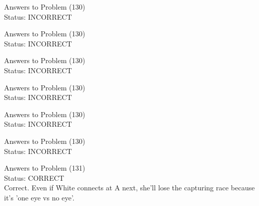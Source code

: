 \documentclass[11pt]{article}
\begin{document}
\begin{minipage}[t]{0.5\textwidth}
  {\centering
  
  Answers to Problem (130)\\
  Status: INCORRECT\\
  
  }
\end{minipage}
\begin{minipage}[t]{0.5\textwidth}
  {\centering
  
  Answers to Problem (130)\\
  Status: INCORRECT\\
  
  }
\end{minipage}
\begin{minipage}[t]{0.5\textwidth}
  {\centering
  
  Answers to Problem (130)\\
  Status: INCORRECT\\
  
  }
\end{minipage}
\begin{minipage}[t]{0.5\textwidth}
  {\centering
  
  Answers to Problem (130)\\
  Status: INCORRECT\\
  
  }
\end{minipage}
\begin{minipage}[t]{0.5\textwidth}
  {\centering
  
  Answers to Problem (130)\\
  Status: INCORRECT\\
  
  }
\end{minipage}
\begin{minipage}[t]{0.5\textwidth}
  {\centering
  
  Answers to Problem (130)\\
  Status: INCORRECT\\
  
  }
\end{minipage}
\begin{minipage}[t]{0.5\textwidth}
  {\centering
  
  Answers to Problem (131)\\
  Status: CORRECT\\
  Correct. Even if White connects at A next, she'll lose the capturing race because it's 'one eye vs no eye'.\\
  }
\end{minipage}
\end{document}
